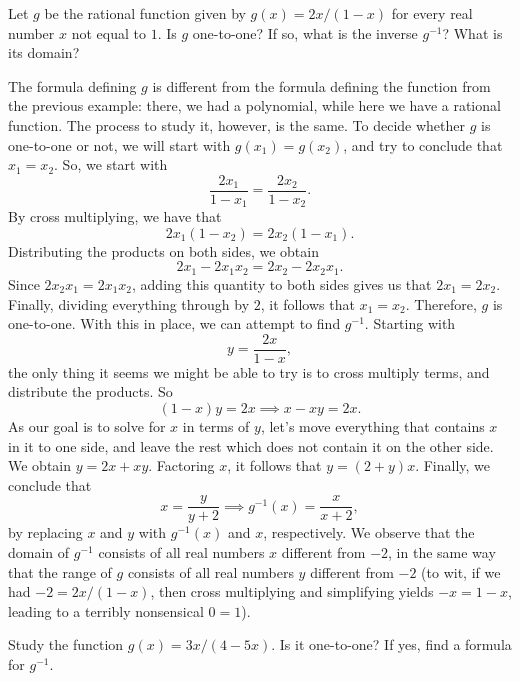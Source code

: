 \documentclass[nooutcomes]{ximera}
\begin{document}
\begin{example} 
  Let $g$ be the rational function given by $g(x) = 2x/(1-x)$ for every real number $x$ not equal to $1$. Is $g$ one-to-one? If so, what is the inverse $g^{-1}$? What is its domain?

  \begin{explanation}
    The formula defining $g$ is different from the formula defining the function from the previous example: there, we had a polynomial, while here we have a rational function. The process to study it, however, is the same. To decide whether $g$ is one-to-one or not, we will start with $g(x_1)=g(x_2)$, and try to conclude that $x_1=x_2$. So, we start with $$\frac{2x_1}{1-x_1} = \frac{2x_2}{1-x_2}.$$By cross multiplying, we have that $$2x_1(1-x_2) = 2x_2(1-x_1).$$Distributing the products on both sides, we obtain $$2x_1-2x_1x_2 = 2x_2-2x_2x_1.$$Since $2x_2x_1=2x_1x_2$, adding this quantity to both sides gives us that $2x_1=2x_2$. Finally, dividing everything through by $2$, it follows that $x_1=x_2$. Therefore, $g$ is one-to-one. With this in place, we can attempt to find $g^{-1}$. Starting with $$y = \frac{2x}{1-x},$$the only thing it seems we might be able to try is to cross multiply terms, and distribute the products. So $$(1-x)y = 2x \implies x-xy = 2x.$$As our goal is to solve for $x$ in terms of $y$, let's move everything that contains $x$ in it to one side, and leave the rest which does not contain it on the other side. We obtain $y = 2x+xy$. Factoring $x$, it follows that $y = (2+y)x$. Finally, we conclude that $$x=\frac{y}{y+2}\implies g^{-1}(x) = \frac{x}{x+2},$$by replacing $x$ and $y$ with $g^{-1}(x)$ and $x$, respectively. We observe that the domain of $g^{-1}$ consists of all real numbers $x$ different from $-2$, in the same way that the range of $g$ consists of all real numbers $y$ different from $-2$ (to wit, if we had $-2 = 2x/(1-x)$, then cross multiplying and simplifying yields $-x=1-x$, leading to a terribly nonsensical $0=1$).
  \end{explanation}
\end{example}

\begin{exploration}
  Study the function $g(x) = 3x/(4-5x)$. Is it one-to-one? If yes, find a formula for $g^{-1}$.
\end{exploration}
\end{document}
